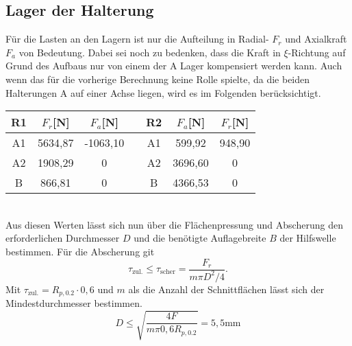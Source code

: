 \subsection{Lager der Halterung}
Für die Lasten an den Lagern ist nur die Aufteilung in Radial- $F_r$ und Axialkraft $F_a$ von Bedeutung. Dabei sei noch zu bedenken, dass die Kraft in $\xi$-Richtung auf Grund des Aufbaus nur von einem der A Lager kompensiert werden kann. Auch wenn das für die vorherige Berechnung keine Rolle spielte, da die beiden Halterungen A auf einer Achse liegen, wird es im Folgenden berücksichtigt.
\begin{table}[h] 
	\centering 
	\begin{tabular}{c|c|cc||c|c|c} 
		\textbf{R1}&$F_{r}$[N]&$F_a$[N]&&\textbf{R2}&$F_{a}$[N]&$F_r$[N]\\ 
		\hline 
		A1& 5634,87&-1063,10&&A1&599,92&948,90\\
		A2&1908,29&0&&A2&3696,60&0\\
		B&866,81&0&&B&4366,53&0\\
	\end{tabular}
\end{table} \\
Aus diesen Werten lässt sich nun über die Flächenpressung und Abscherung den erforderlichen Durchmesser $D$ und die benötigte Auflagebreite $B$ der Hilfswelle bestimmen. Für die Abscherung git
\begin{equation}
	\tau_{\mathrm{zul.}}\leq\tau_\mathrm{scher}=\frac{F_r}{m\pi D^2/4}.
\end{equation}
Mit $\tau_{\mathrm{zul.}}=R_{p, 0.2}\cdot 0,6$ \cite{metall} und $m$ als die Anzahl der Schnittflächen lässt sich der Mindestdurchmesser bestimmen.
\begin{equation}
	D \leq \sqrt{\frac{4F}{m\pi 0,6 R_{p, 0.2}}}= 5,5\mathrm{mm}
\end{equation}
